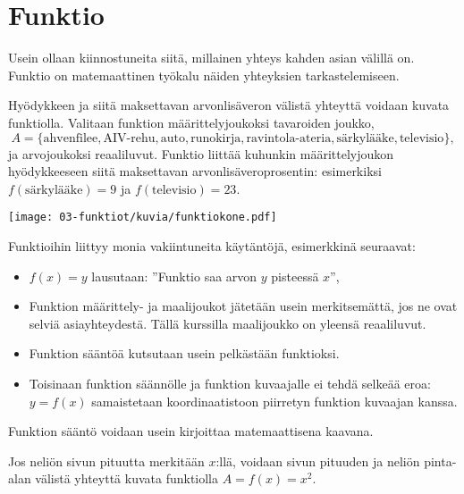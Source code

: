 \chapter{Funktio}

Usein ollaan kiinnostuneita siitä, millainen yhteys kahden asian välillä
on. Funktio on matemaattinen työkalu näiden yhteyksien tarkastelemiseen.


\begin{esimerkki}
Hyödykkeen ja siitä maksettavan arvonlisäveron välistä yhteyttä
voidaan kuvata funktiolla. Valitaan funktion määrittelyjoukoksi
tavaroiden joukko,
\[
A = \{\text{ahvenfilee}, \text{AIV-rehu}, \text{auto}, \text{runokirja}, \text{ravintola-ateria}, \text{särkylääke}, \text{televisio}\},
\]
ja arvojoukoksi reaaliluvut. Funktio liittää kuhunkin määrittelyjoukon
hyödykkeeseen siitä maksettavan arvonlisäveroprosentin: esimerkiksi
$f(\text{särkylääke}) = 9$ ja $f(\text{televisio}) = 23$.

\begin{center}
\texttt{[image: 03-funktiot/kuvia/funktiokone.pdf]}
\end{center}
\end{esimerkki}


Funktioihin liittyy monia vakiintuneita käytäntöjä, esimerkkinä seuraavat:
\begin{itemize}
\item $f(x) = y$ lausutaan: ''Funktio saa arvon $y$ pisteessä $x$'',
\item Funktion määrittely- ja maalijoukot jätetään usein merkitsemättä, jos ne ovat selviä asiayhteydestä. Tällä kurssilla maalijoukko on yleensä reaaliluvut.
\item Funktion sääntöä kutsutaan usein pelkästään funktioksi.
\item Toisinaan funktion säännölle ja funktion kuvaajalle ei tehdä selkeää eroa:
$y = f(x)$ samaistetaan koordinaatistoon piirretyn funktion kuvaajan kanssa.
\end{itemize}

Funktion sääntö voidaan usein kirjoittaa matemaattisena kaavana.


\begin{esimerkki}
Jos neliön sivun pituutta merkitään $x$:llä, voidaan sivun pituuden
ja neliön pinta-alan välistä yhteyttä kuvata funktiolla
$A = f(x) = x^2$.
\end{esimerkki}

